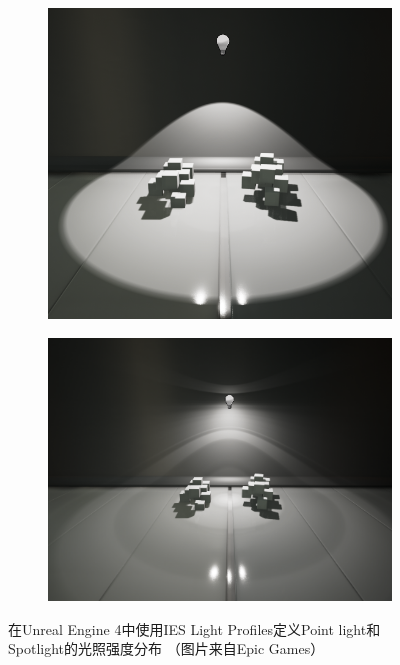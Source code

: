 \begin{figure}
\begin{fullwidth}
\begin{subfigure}[b]{0.213\thewidth}
	\end{subfigure}
	\begin{subfigure}[b]{0.247\thewidth}
		\includegraphics[width=1.\textwidth]{figures/intro/IES_03}
	\end{subfigure}
	\begin{subfigure}[b]{0.293\thewidth}
		\includegraphics[width=1.\textwidth]{figures/intro/IES_04}
	\end{subfigure}
\caption{在Unreal Engine 4中使用IES Light Profiles定义Point light和Spotlight的光照强度分布 （图片来自Epic Games）}
\label{f:intro-ies}
\end{fullwidth}
\end{figure}

